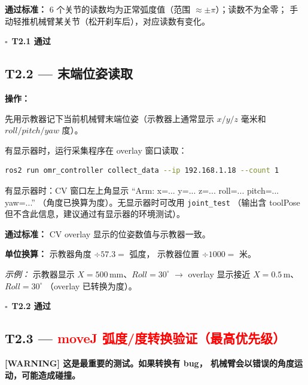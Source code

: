 \documentclass[12pt,a4paper,fontset=ubuntu]{ctexart}
\newcommand{\chkbox}{$\square$}
\newcommand{\passcriteria}[1]{%
  \textbf{通过标准：} #1%
}
\begin{document}
\passcriteria{
  6 个关节的读数均为正常弧度值（范围 $\approx \pm\pi$）；读数不为全零；
  手动轻推机械臂某关节（松开刹车后），对应读数有变化。
}

\begin{center}\chkbox\ \textbf{T2.1 通过}\end{center}


\subsection{T2.2 — 末端位姿读取}

\textbf{操作：}

先用示教器记下当前机械臂末端位姿（示教器上通常显示 $x/y/z$ 毫米和
$roll/pitch/yaw$ 度）。

有显示器时，运行采集程序在 overlay 窗口读取：

\begin{lstlisting}[language=bash]
ros2 run omr_controller collect_data --ip 192.168.1.18 --count 1
\end{lstlisting}

\begin{infobox}
有显示器时：CV 窗口左上角显示 ``Arm: x=... y=... z=... roll=... pitch=... yaw=...''
（角度已换算为度）。无显示器时可改用 \texttt{joint\_test}
（输出含 toolPose 但不含此信息，建议通过有显示器的环境测试）。
\end{infobox}

\passcriteria{
  CV overlay 显示的位姿数值与示教器一致。

  \textbf{单位换算：} 示教器角度 $\div 57.3 =$ 弧度，
  示教器位置 $\div 1000 =$ 米。

  \textit{示例：} 示教器显示 $X=500\,\text{mm}$、$Roll=30^\circ$
  $\rightarrow$ overlay 显示接近 $X=0.5\,\text{m}$、$Roll=30^\circ$
  （overlay 已转换为度）。
}

\begin{center}\chkbox\ \textbf{T2.2 通过}\end{center}


\subsection{T2.3 — \textcolor{red}{moveJ 弧度/度转换验证（最高优先级）}}

\begin{criticalbox}
\textbf{\large [WARNING] 这是最重要的测试。如果转换有 bug，
机械臂会以错误的角度运动，可能造成碰撞。}
\end{criticalbox}
\end{document}
